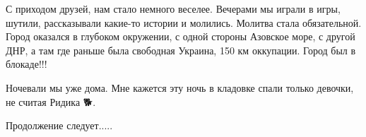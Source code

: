 С приходом друзей, нам стало немного веселее. Вечерами мы играли в игры,
шутили, рассказывали какие-то истории и молились. Молитва стала обязательной.
Город оказался в глубоком окружении, с одной стороны Азовское море, с другой
ДНР, а там где раньше была свободная Украина, 150 км оккупации. Город был в
блокаде!!!

Ночевали мы уже дома. Мне кажется эту ночь в кладовке спали только девочки, не
считая Ридика 🐕. 

Продолжение следует.....

